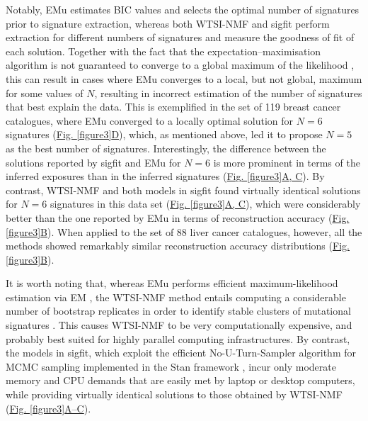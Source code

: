 Notably, EMu estimates BIC values and selects the optimal number of signatures prior to signature extraction, whereas both WTSI-NMF and sigfit perform extraction for different numbers of signatures and measure the goodness of fit of each solution. Together with the fact that the expectation–maximisation algorithm is not guaranteed to converge to a global maximum of the likelihood \cite{Dempster1977}, this can result in cases where EMu converges to a local, but not global, maximum for some values of $N$, resulting in incorrect estimation of the number of signatures that best explain the data. This is exemplified in the set of 119 breast cancer catalogues, where EMu converged to a locally optimal solution for $N=6$ signatures (\hyperref[figure3]{Fig. \ref*{figure3}D}), which, as mentioned above, led it to propose $N=5$ as the best number of signatures. Interestingly, the difference between the solutions reported by sigfit and EMu for $N=6$ is more prominent in terms of the inferred exposures than in the inferred signatures (\hyperref[figure3]{Fig. \ref*{figure3}A, C}). By contrast, WTSI-NMF and both models in sigfit found virtually identical solutions for $N=6$ signatures in this data set (\hyperref[figure3]{Fig. \ref*{figure3}A, C}), which were considerably better than the one reported by EMu in terms of reconstruction accuracy (\hyperref[figure3]{Fig. \ref*{figure3}B}). When applied to the set of 88 liver cancer catalogues, however, all the methods showed remarkably similar reconstruction accuracy distributions (\hyperref[figure3]{Fig. \ref*{figure3}B}).

It is worth noting that, whereas EMu performs efficient maximum-likelihood estimation via EM \cite{Fischer2013}, the WTSI-NMF method entails computing a considerable number of bootstrap replicates in order to identify stable clusters of mutational signatures \cite{AlexandrovCellRep2013}. This causes WTSI-NMF to be very computationally expensive, and probably best suited for highly parallel computing infrastructures. By contrast, the models in sigfit, which exploit the efficient No-U-Turn-Sampler algorithm for MCMC sampling implemented in the Stan framework \citep{stanMain}, incur only moderate memory and CPU demands that are easily met by laptop or desktop computers, while providing virtually identical solutions to those obtained by WTSI-NMF (\hyperref[figure3]{Fig. \ref*{figure3}A--C}).

